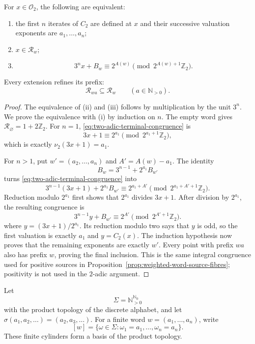 \begin{lemma}
\label{lem:two-adic-prefix-cylinders}
For $x\in\mathcal O_2$, the following are equivalent:
\begin{enumerate}[label=\textup{(\roman*)}]
\item the first $n$ iterates of $C_2$ are defined at $x$ and their successive
valuation exponents are $a_1,\ldots,a_n$;
\item $x\in\mathcal R_w$;
\item
\begin{equation}
\label{eq:two-adic-terminal-congruence}
 3^n x+B_w\equiv2^{A(w)}\pmod{2^{A(w)+1}\mathbb Z_2}.
\end{equation}
\end{enumerate}
Every extension refines its prefix:
\[
 \mathcal R_{wa}\subseteq\mathcal R_w
 \qquad(a\in\mathbb N_{>0}).
\]
\end{lemma}

\begin{proof}
The equivalence of (ii) and (iii) follows by multiplication by the unit
$3^n$.  We prove the equivalence with (i) by induction on $n$.  The empty
word gives $\mathcal R_\varnothing=1+2\mathbb Z_2$.  For $n=1$,
\eqref{eq:two-adic-terminal-congruence} is
\[
 3x+1\equiv2^{a_1}\pmod{2^{a_1+1}\mathbb Z_2},
\]
which is exactly $\nu_2(3x+1)=a_1$.

For $n>1$, put $w'=(a_2,\ldots,a_n)$ and $A'=A(w)-a_1$.  The identity
\[
 B_w=3^{n-1}+2^{a_1}B_{w'}
\]
turns \eqref{eq:two-adic-terminal-congruence} into
\[
 3^{n-1}(3x+1)+2^{a_1}B_{w'}
 \equiv2^{a_1+A'}\pmod{2^{a_1+A'+1}\mathbb Z_2}.
\]
Reduction modulo $2^{a_1}$ first shows that $2^{a_1}$ divides $3x+1$.
After division by $2^{a_1}$, the resulting congruence is
\[
 3^{n-1}y+B_{w'}
 \equiv2^{A'}\pmod{2^{A'+1}\mathbb Z_2}.
\]
where $y=(3x+1)/2^{a_1}$.  Its reduction modulo two says that $y$ is odd, so
the first valuation is exactly $a_1$ and $y=C_2(x)$.  The induction
hypothesis now proves that the remaining
exponents are exactly $w'$.  Every point with prefix $wa$ also has prefix
$w$, proving the final inclusion.  This is the same integral congruence used
for positive sources in Proposition~\ref{prop:weighted-word-source-fibres};
positivity is not used in the $2$-adic argument.
\end{proof}

Let
\[
 \Sigma=\mathbb N_{>0}^{\mathbb N_0}
\]
with the product topology of the discrete alphabet, and let
$\sigma(a_1,a_2,\ldots)=(a_2,a_3,\ldots)$.
For a finite word $w=(a_1,\ldots,a_n)$, write
\[
 [w]=\{\omega\in\Sigma:\omega_1=a_1,\ldots,\omega_n=a_n\}.
\]
These finite cylinders form a basis of the product topology.

